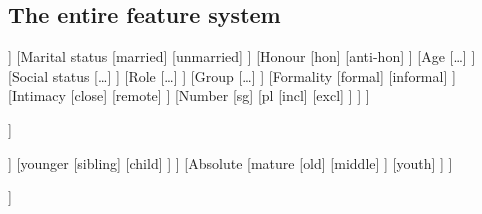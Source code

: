 \documentclass[12pt]{article}
\begin{document}
\begin{landscape}
\section{The entire feature system}
\begin{forest}
[Interpersonal
	[Gender
		[\ldots]
	]
	[{Marital status}
		[\textsf{married}]
		[\textsf{unmarried}]
	]
	[Honour
		[\textsf{hon}]
		[\textsf{anti-hon}]
	]
	[Age
		[\ldots]
	]
	[{Social status}
		[\ldots]
	]
	[Role
		[\ldots]
	]
	[Group
		[\ldots]
	]
	[Formality
		[\textsf{formal}]
		[\textsf{informal}]
	]
	[Intimacy
		[\textsf{close}]
		[\textsf{remote}]
	]
	[Number
		[\textsf{sg}]
		[\textsf{pl}
			[\textsf{incl}]
			[\textsf{excl}]
		]
	]
]
\end{forest}

\begin{forest}
	[Gender
		[\textsf{male}]
		[\textsf{female}]
		[\textsf{other}]
	]
\end{forest}

\begin{forest}
	[Age
		[Relative
			[\textsf{elder}
				[\textsf{grandparent}]
				[\textsf{parents\_}\\\textsf{elder\_sibling}]
				[\textsf{parent}]
				[\textsf{parents\_}\\\textsf{younger\_sibling}]
				[\textsf{sibling}]
			]
			[\textsf{younger}
				[\textsf{sibling}]
				[\textsf{child}]
			]
		]
		[Absolute
			[\textsf{mature}
				[\textsf{old}]
				[\textsf{middle}]
			]
			[\textsf{youth}]
		]
	]
\end{forest}

\begin{forest}
	[{Social status}
		[\textsf{higher}]
		[\textsf{equal\_or\_higher}]
		[\textsf{equal}]
		[\textsf{equal\_or\_lower}]
		[\textsf{lower}]
	]
\end{forest}


\end{landscape}
\end{document}
